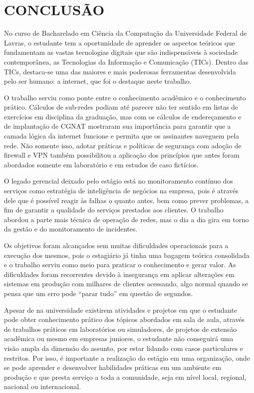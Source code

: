 \chapter{CONCLUSÃO}
\label{cap:conclusao}

    No curso de Bacharelado em Ciência da Computação da Universidade Federal de Lavras, o estudante tem a oportunidade de aprender os aspectos teóricos que fundamentam as vastas tecnologias digitais que são indispensáveis à sociedade contemporânea, as Tecnologias da Informação e Comunicação (TICs). Dentro das TICs, destaca-se uma das maiores e mais poderosas ferramentas desenvolvida pelo ser humano: a internet, que foi o destaque neste trabalho.

    O trabalho serviu como ponte entre o conhecimento acadêmico e o conhecimento prático. Cálculos de sub-redes podiam até parecer não ter sentido em listas de exercícios em disciplina da graduação, mas com os cálculos de endereçamento e de implantação de CGNAT mostraram sua importância para garantir que a camada lógica da internet funcione e permita que os assinantes naveguem pela rede. Não somente isso, adotar práticas e políticas de segurança com adoção de firewall e VPN também possibilitou a aplicação dos princípios que antes foram abordados somente em laboratório e em estudos de caso fictícios.
    
    O legado gerencial deixado pelo estágio está no monitoramento contínuo dos serviços como estratégia de inteligência de negócios na empresa, pois é através dele que é possível reagir às falhas o quanto antes, bem como prever problemas, a fim de garantir a qualidade do serviços prestados aos clientes. O trabalho abordou a parte mais técnica de operação de redes, mas o dia a dia gira em torno da gestão e do monitoramento de incidentes.
    
    Os objetivos foram alcançados sem muitas dificuldades operacionais para a execução dos mesmos, pois o estagiário já tinha uma bagagem teórica consolidada e o trabalho serviu como meio para praticar o conhecimento e gerar valor. As dificuldades foram recorrentes devido à insegurança em aplicar alterações em sistemas em produção com milhares de clientes acessando, algo normal quando se pensa que um erro pode 
   ``parar tudo'' em questão de segundos.

    Apesar de na universidade existirem atividades e projetos em que o estudante pode obter conhecimento prático dos tópicos abordados em sala de aula, através de trabalhos práticos em laboratórios ou simuladores, de projetos de extensão acadêmica ou mesmo em empresas juniores, o estudante não conseguirá uma visão ampla da dimensão do assunto, por estar lidando com casos particulares e restritos. Por isso, é importante a realização do estágio em uma organização, onde se pode aprender e desenvolver habilidades práticas em um ambiente em produção e que presta serviço a toda a comunidade, seja em nível local, regional, nacional ou internacional.
    
